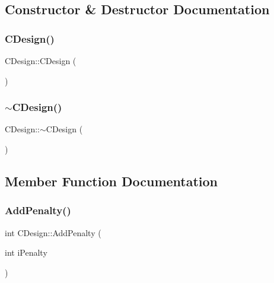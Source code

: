 \subsection{Constructor \& Destructor Documentation}
\mbox{\label{classCDesign_a87d140d2c8dbaa85b77f41d7724cc309}} 
\subsubsection{\texorpdfstring{CDesign()}{CDesign()}}
{\footnotesize\ttfamily C\+Design\+::\+C\+Design (\begin{DoxyParamCaption}{ }\end{DoxyParamCaption})}

\mbox{\label{classCDesign_a230641b0a13390b934de6ff40b869e01}} 
\subsubsection{\texorpdfstring{$\sim$CDesign()}{~CDesign()}}
{\footnotesize\ttfamily C\+Design\+::$\sim$\+C\+Design (\begin{DoxyParamCaption}{ }\end{DoxyParamCaption})\hspace{0.3cm}{\ttfamily [virtual]}}



\subsection{Member Function Documentation}
\mbox{\label{classCDesign_acd0487c3ffd7edf494d4b5d049bd9a3f}} 
\subsubsection{\texorpdfstring{AddPenalty()}{AddPenalty()}}
{\footnotesize\ttfamily int C\+Design\+::\+Add\+Penalty (\begin{DoxyParamCaption}\item[{int}]{i\+Penalty }\end{DoxyParamCaption})}



